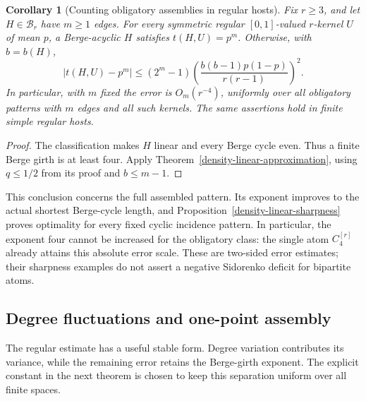 \documentclass[a4paper,11pt,reqno]{amsart}
\theoremstyle{plain}
\newtheorem{corollary}[theorem]{Corollary}
\theoremstyle{definition}
\theoremstyle{remark}
\begin{document}
\begin{corollary}[Counting obligatory assemblies in regular hosts]
\label{density-obligatory-regular}
Fix $r\ge3$, and let $H\in\mathcal B_r$ have $m\ge1$ edges.
For every symmetric regular $[0,1]$-valued $r$-kernel $U$ of mean
$p$, a Berge-acyclic $H$ satisfies $t(H,U)=p^m$.  Otherwise, with
$b=b(H)$,
\[
 |t(H,U)-p^m|
 \le(2^m-1)
       \left(\frac{b(b-1)p(1-p)}{r(r-1)}\right)^2.
\]
In particular, with $m$ fixed the error is $O_m(r^{-4})$, uniformly
over all obligatory patterns with $m$ edges and all such kernels.
The same assertions hold in finite simple regular hosts.
\end{corollary}
\begin{proof}
The classification makes $H$ linear and every Berge cycle even.
Thus a finite Berge girth is at least four.  Apply
Theorem~\ref{density-linear-approximation}, using $q\le1/2$ from
its proof and $b\le m-1$.
\end{proof}

This conclusion concerns the full assembled pattern.  Its exponent
improves to the actual shortest Berge-cycle length, and
Proposition~\ref{density-linear-sharpness} proves optimality for
every fixed cyclic incidence pattern.  In particular, the exponent
four cannot be increased for the obligatory class: the single atom
$C_4^{[r]}$ already attains this absolute error scale.  These are
two-sided error estimates; their sharpness examples do not assert a
negative Sidorenko deficit for bipartite atoms.

\subsection{Degree fluctuations and one-point assembly}

The regular estimate has a useful stable form.  Degree variation
contributes its variance, while the remaining error retains the
Berge-girth exponent.  The explicit constant in the next theorem
is chosen to keep this separation uniform over all finite spaces.
\end{document}
